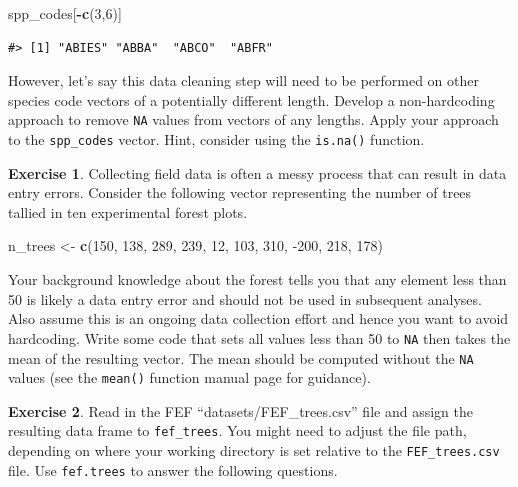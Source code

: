 \documentclass[
  11pt,
]{krantz}
\newenvironment{Shaded}{\begin{snugshade}}{\end{snugshade}}
\newcommand{\DecValTok}[1]{\textcolor[rgb]{0.00,0.00,0.81}{#1}}
\newcommand{\KeywordTok}[1]{\textcolor[rgb]{0.13,0.29,0.53}{\textbf{#1}}}
\newcommand{\NormalTok}[1]{#1}
\newcommand{\OperatorTok}[1]{\textcolor[rgb]{0.81,0.36,0.00}{\textbf{#1}}}
\newcommand{\StringTok}[1]{\textcolor[rgb]{0.31,0.60,0.02}{#1}}
\theoremstyle{definition}
\theoremstyle{definition}
\theoremstyle{definition}
\newtheorem{exercise}{Exercise}[chapter]
\theoremstyle{definition}
\theoremstyle{remark}
\begin{document}
\begin{Shaded}
\begin{Highlighting}[]
\NormalTok{spp\_codes[}\OperatorTok{{-}}\KeywordTok{c}\NormalTok{(}\DecValTok{3}\NormalTok{,}\DecValTok{6}\NormalTok{)]}
\end{Highlighting}
\end{Shaded}

\begin{verbatim}
#> [1] "ABIES" "ABBA"  "ABCO"  "ABFR"
\end{verbatim}

However, let's say this data cleaning step will need to be performed on other species code vectors of a potentially different length. Develop a non-hardcoding approach to remove \texttt{NA} values from vectors of any lengths. Apply your approach to the \texttt{spp\_codes} vector. Hint, consider using the \texttt{is.na()} function.

\begin{exercise}
\protect\hypertarget{exr:data11}{}\label{exr:data11}Collecting field data is often a messy process that can result in data entry errors. Consider the following vector representing the number of trees tallied in ten experimental forest plots.
\end{exercise}

\begin{Shaded}
\begin{Highlighting}[]
\NormalTok{n\_trees \textless{}{-}}\StringTok{ }\KeywordTok{c}\NormalTok{(}\DecValTok{150}\NormalTok{, }\DecValTok{138}\NormalTok{, }\DecValTok{289}\NormalTok{, }\DecValTok{239}\NormalTok{, }\DecValTok{12}\NormalTok{, }\DecValTok{103}\NormalTok{, }\DecValTok{310}\NormalTok{, }\DecValTok{{-}200}\NormalTok{, }\DecValTok{218}\NormalTok{, }\DecValTok{178}\NormalTok{)}
\end{Highlighting}
\end{Shaded}

Your background knowledge about the forest tells you that any element less than 50 is likely a data entry error and should not be used in subsequent analyses. Also assume this is an ongoing data collection effort and hence you want to avoid hardcoding. Write some code that sets all values less than 50 to \texttt{NA} then takes the mean of the resulting vector. The mean should be computed without the \texttt{NA} values (see the \texttt{mean()} function manual page for guidance).

\begin{exercise}
\protect\hypertarget{exr:data12}{}\label{exr:data12}Read in the FEF ``datasets/FEF\_trees.csv'' file and assign the resulting data frame to \texttt{fef\_trees}. You might need to adjust the file path, depending on where your working directory is set relative to the \texttt{FEF\_trees.csv} file. Use \texttt{fef.trees} to answer the following questions.
\end{exercise}
\end{document}
